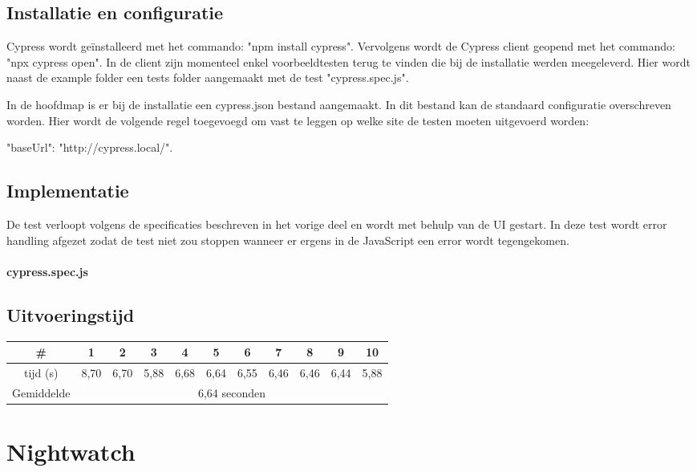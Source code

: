 \subsection{Installatie en configuratie}


Cypress wordt geïnstalleerd met het commando: "npm install cypress". Vervolgens wordt de Cypress client geopend met het commando: "npx cypress open". In de client zijn momenteel enkel voorbeeldtesten terug te vinden die bij de installatie werden meegeleverd. Hier wordt naast de example folder een tests folder aangemaakt met de test "cypress.spec.js".

In de hoofdmap is er bij de installatie een cypress.json bestand aangemaakt. In dit bestand kan de standaard configuratie overschreven worden. Hier wordt de volgende regel toegevoegd om vast te leggen op welke site de testen moeten uitgevoerd worden: 

"baseUrl": "http://cypress.local/".

\subsection{Implementatie}
De test verloopt volgens de specificaties beschreven in het vorige deel en wordt met behulp van de \gls{UI} gestart. In deze test wordt error handling afgezet zodat de test niet zou stoppen wanneer er ergens in de JavaScript een error wordt tegengekomen.

\paragraph{cypress.spec.js}
\subsection{Uitvoeringstijd}

\begin{tabular}{ |c| |c |c |c |c |c |c |c |c |c |c| }
\hline
	\# & 1 & 2 & 3 & 4 & 5 & 6 & 7 & 8 & 9 & 10\\
\hline
	tijd (s) & 8,70 & 6,70 & 5,88 & 6,68 & 6,64 & 6,55 & 6,46 & 6,46 & 6,44 & 5,88\\
\hline
 Gemiddelde & \multicolumn{10}{c|}{6,64 seconden}\\
\hline
\end{tabular}

\clearpage
\section{Nightwatch}

